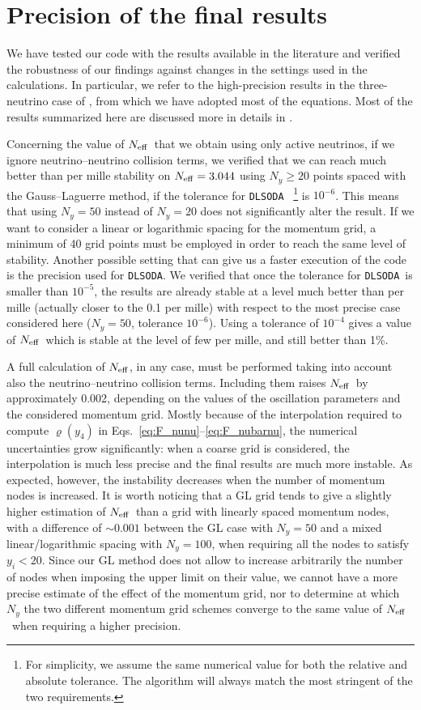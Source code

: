 \documentclass[notitlepage,showpacs,preprintnumbers,amsmath,amssymb,superscriptaddress,prd,onecolumn]{revtex4-1}
\newcommand{\Neff}{\ensuremath{N_{\rm eff}}}
\newcommand{\dlsoda}{\texttt{DLSODA}}
\begin{document}
\section{Precision of the final results}
\label{ssec:precision}
We have tested our code with the results available in the literature and
verified the robustness of our findings against changes in the settings used in the calculations.
In particular, we refer to the high-precision results in the three-neutrino case of \cite{deSalas:2016ztq},
from which we have adopted most of the equations.
Most of the results summarized here are discussed more in details in \cite{Gariazzo:2019gyi,Bennett:inprep}.

Concerning the value of \Neff\ that we obtain using only active neutrinos,
if we ignore neutrino--neutrino collision terms,
we verified that we can reach much better than per mille stability on $\Neff=3.044$
using $N_y\geq20$ points spaced with the Gauss--Laguerre method,
if the tolerance for \dlsoda~%
\footnote{For simplicity, we assume the same numerical value for both the relative and absolute tolerance.
The algorithm will always match the most stringent of the two requirements.}
is $10^{-6}$.
This means that using $N_y=50$ instead of $N_y=20$ does not significantly alter the result.
If we want to consider a linear or logarithmic spacing for the momentum grid,
a minimum of 40 grid points must be employed in order to reach the same level of stability.
Another possible setting that can give us a faster execution of the code is the precision
used for \dlsoda.
We verified that once the tolerance for \dlsoda\ is smaller than $10^{-5}$,
the results are already stable at a level much better than per mille
(actually closer to the 0.1 per mille)
with respect to the most precise case considered here
($N_y=50$, tolerance $10^{-6}$).
Using a tolerance of $10^{-4}$ gives a value of \Neff\ which is stable
at the level of few per mille, and still better than 1\%.

A full calculation of \Neff, in any case, must be performed taking into account also the neutrino--neutrino collision terms.
Including them raises \Neff\ by approximately 0.002,
depending on the values of the oscillation parameters and the considered momentum grid.
Mostly because of the interpolation required to compute $\varrho(y_4)$
in Eqs.~\eqref{eq:F_nunu}--\eqref{eq:F_nubarnu},
the numerical uncertainties grow significantly:
when a coarse grid is considered, the interpolation is much less precise
and the final results are much more instable.
As expected, however, the instability decreases when the number of momentum nodes is increased.
It is worth noticing that a GL grid tends to give a slightly higher estimation of \Neff\
than a grid with linearly spaced momentum nodes, with a difference of $\sim0.001$
between the GL case with $N_y=50$ and a mixed linear/logarithmic spacing with $N_y=100$,
when requiring all the nodes to satisfy $y_i<20$.
Since our GL method does not allow to increase arbitrarily the number of nodes
when imposing the upper limit on their value,
we cannot have a more precise estimate of the effect of the momentum grid,
nor to determine at which $N_y$ the two different momentum grid schemes
converge to the same value of \Neff\ when requiring a higher precision.
\end{document}
